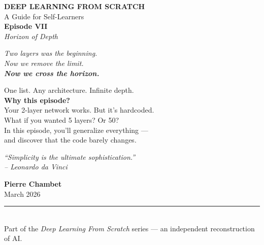 \documentclass[11pt]{article}
\begin{document}
\begin{titlepage}
    \centering
    \vspace*{2.2cm}

    {\Large \textbf{DEEP LEARNING FROM SCRATCH}}\\[0.4em]
    A Guide for Self-Learners\\[2.5em]

    {\Huge \bfseries Episode VII}\\[0.4em]
    {\LARGE \textit{Horizon of Depth}}\\[2em]

    \vspace{0.8cm}

    {\large\itshape
    Two layers was the beginning.\\
    Now we remove the limit.\\[0.8em]
    {\Large \textbf{Now we cross the horizon.}}
    }

    \vspace{0.8cm}

    \begin{tcolorbox}[colback=black!3!white, colframe=black!20!white, width=0.8\textwidth, sharp corners, boxrule=0.4pt]
    \centering
    \itshape

    {\Large One list. Any architecture. Infinite depth.}\\[1em]

    \textbf{Why this episode?}\\[0.3em]
    Your 2-layer network works. But it's hardcoded.\\
    What if you wanted 5 layers? Or 50?\\
    In this episode, you'll generalize everything ---\\
    and discover that the code barely changes.
    \end{tcolorbox}

    \vspace{1.5cm}

    \begin{center}
    \itshape
        {\Large \textit{``Simplicity is the ultimate sophistication.''}}\\
        \vspace{0.2em}
        {\large -- Leonardo da Vinci}
    \end{center}

    \vfill

    {\large \textbf{Pierre Chambet}}\\[0.3em]
    {\small March 2026}\\[1em]
    \rule{0.8\textwidth}{0.4pt}\\[0.4em]
    {\small Part of the \textit{Deep Learning From Scratch} series --- an independent reconstruction of AI.}

\end{titlepage}
\end{document}
